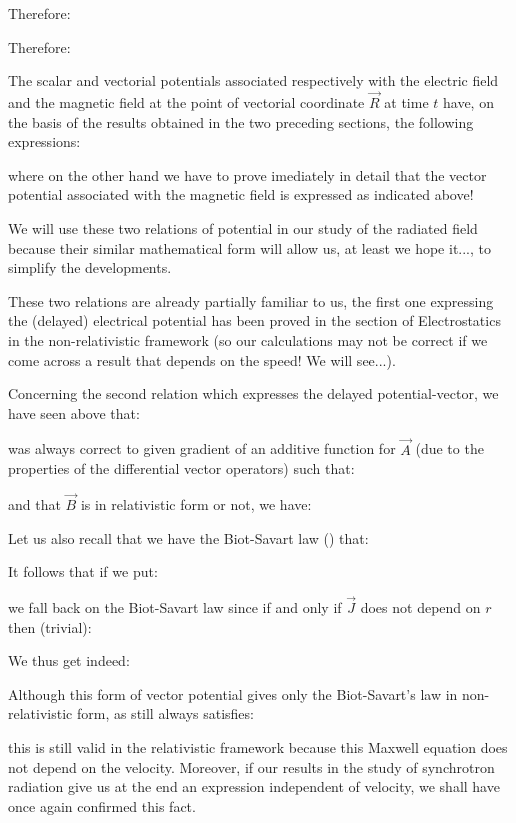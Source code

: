 	Therefore:
	
	Therefore:
		
	The scalar and vectorial potentials associated respectively with the electric field and the magnetic field at the point of vectorial coordinate $\vec{R}$ at time $t$ have, on the basis of the results obtained in the two preceding sections, the following expressions:
	
	where on the other hand we have to prove imediately in detail that the vector potential associated with the magnetic field is expressed as indicated above!
	\begin{tcolorbox}[title=Remark,colframe=black,arc=10pt]
	We will use these two relations of potential in our study of the radiated field because their similar mathematical form will allow us, at least we hope it..., to simplify the developments.
	\end{tcolorbox}
	These two relations are already partially familiar to us, the first one expressing the (delayed) electrical potential has been proved in the section of Electrostatics in the non-relativistic framework (so our calculations may not be correct if we come across a result that depends on the speed! We will see...).

	Concerning the second relation which expresses the delayed potential-vector, we have seen above that:
	
	was always correct to given gradient of an additive function for $\vec{A}$ (due to the properties of the differential vector operators) such that:
	
	and that $\vec{B}$ is in relativistic form or not, we have:
	
	Let us also recall that we have the Biot-Savart law () that:
	
	It follows that if we put:
	
	we fall back on the Biot-Savart law since if and only if $\vec{J}$ does not depend on $r$ then (trivial):
	
	We thus get indeed:
	
	Although this form of vector potential gives only the Biot-Savart's law in non-relativistic form, as still always satisfies:
	
	this is still valid in the relativistic framework because this Maxwell equation does not depend on the velocity. Moreover, if our results in the study of synchrotron radiation give us at the end an expression independent of velocity, we shall have once again confirmed this fact.

